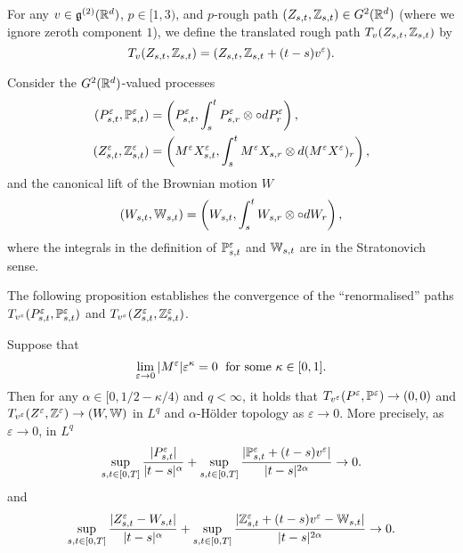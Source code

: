 \documentclass{article}
\begin{document}
For any $v \in \mathfrak g^{(2)}(\mathbb R^d)$, $p \in [1,3)$, and $p$-rough path $(Z_{s,t},\mathbb Z_{s,t}) \in G^2(\mathbb R^d)$ (where we ignore zeroth component $1$), we define the translated rough path $T_v(Z_{s,t}, \mathbb Z_{s,t})$ by
\begin{equation}\label{eq:TvDef}
T_v(Z_{s,t}, \Z_{s,t}) = (Z_{s,t}, \Z_{s,t} + (t-s)v^\varepsilon).
\end{equation}


Consider the $G^2(\mathbb R^d)$-valued processes
\begin{align*}
(P^\varepsilon_{s,t}, \Pbb^\varepsilon_{s,t}) &= \left(P^\varepsilon_{s,t}, \int_s^t P^\varepsilon_{s,r} \otimes \circ dP^\varepsilon_r\right), \\
(Z^\varepsilon_{s,t}, \Z^\varepsilon_{s,t}) &= \left(M^\varepsilon X^\varepsilon_{s,t}, \int_s^t M^\varepsilon X_{s,r} \otimes d(M^\varepsilon X^\varepsilon)_r \right),
\end{align*}
and the canonical lift of the Brownian motion $W$
\[
(W_{s,t}, \mathbb W_{s,t}) = \left(W_{s,t}, \int_s^t W_{s,r} \otimes \circ dW_r\right),
\]
where the integrals in the definition of $\Pbb^\varepsilon_{s,t}$ and $\mathbb W_{s,t}$ are in the Stratonovich sense.

The following proposition establishes the convergence of the ``renormalised'' paths $T_{v^\varepsilon}(P^\varepsilon_{s,t}, \Pbb^\varepsilon_{s,t})$ and $T_{v^\varepsilon}(Z^\varepsilon_{s,t}, \Z^\varepsilon_{s,t})$.

\begin{theorem}\label{thm:magneticConv}
Suppose that
\begin{equation}\label{eq:MBound}
\lim_{\varepsilon \rightarrow 0} |M^\varepsilon|\varepsilon^\kappa = 0 \; \textnormal{ for some } \kappa \in [0,1].
\end{equation}
Then for any $\alpha \in [0,1/2-\kappa/4)$ and $q < \infty$, it holds that $T_{v^\varepsilon}(P^\varepsilon, \Pbb^\varepsilon) \rightarrow (0,0)$ and $T_{v^\varepsilon}(Z^\varepsilon, \Z^\varepsilon) \rightarrow (W,\W)$ in $L^q$ and $\alpha$-H{\"o}lder topology as $\varepsilon \rightarrow 0$. More precisely, as $\varepsilon \rightarrow 0$, in $L^q$
\[
\sup_{s,t \in [0,T]} \frac{|P^\varepsilon_{s,t}|}{|t-s|^\alpha} + \sup_{s,t \in [0,T]} \frac{|\Pbb^\varepsilon_{s,t} + (t-s)v^\varepsilon|}{|t-s|^{2\alpha}} \rightarrow 0.
\]
and
\[
\sup_{s,t \in [0,T]} \frac{|Z^\varepsilon_{s,t} - W_{s,t}|}{|t-s|^\alpha} + \sup_{s,t \in [0,T]} \frac{|\Z^\varepsilon_{s,t} + (t-s)v^\varepsilon - \W_{s,t}|}{|t-s|^{2\alpha}} \rightarrow 0.
\]
\end{theorem}
\end{document}
